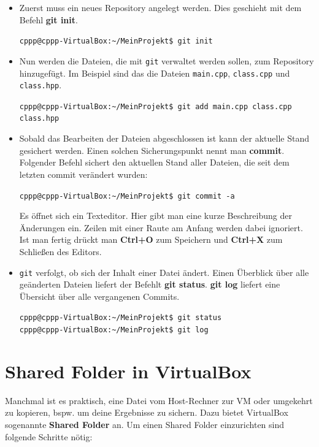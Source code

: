 \begin{itemize}
\item Zuerst muss ein neues Repository angelegt werden. Dies geschieht mit dem Befehl \textbf{git init}.

\texttt{cppp@cppp-VirtualBox:\textasciitilde/MeinProjekt\$ git init}

\item Nun werden die Dateien, die mit \texttt{git} verwaltet werden sollen, zum Repository hinzugefügt. Im Beispiel sind das die Dateien \texttt{main.cpp}, \texttt{class.cpp} und \texttt{class.hpp}.

\texttt{cppp@cppp-VirtualBox:\textasciitilde/MeinProjekt\$ git add main.cpp class.cpp class.hpp}

\item Sobald das Bearbeiten der Dateien abgeschlossen ist kann der aktuelle Stand gesichert werden. Einen solchen Sicherungspunkt nennt man \textbf{commit}. Folgender Befehl sichert den aktuellen Stand aller Dateien, die seit dem letzten commit verändert wurden:

\texttt{cppp@cppp-VirtualBox:\textasciitilde/MeinProjekt\$ git commit -a}

Es öffnet sich ein Texteditor. Hier gibt man eine kurze Beschreibung der Änderungen ein. Zeilen mit einer Raute am Anfang werden dabei ignoriert. Ist man fertig drückt man \textbf{Ctrl+O} zum Speichern und \textbf{Ctrl+X} zum Schließen des Editors.

\item \texttt{git} verfolgt, ob sich der Inhalt einer Datei ändert. Einen Überblick über alle geänderten Dateien liefert der Befehlt \textbf{git status}. \textbf{git log} liefert eine Übersicht über alle vergangenen Commits.

\texttt{cppp@cppp-VirtualBox:\textasciitilde/MeinProjekt\$ git status}\\
\texttt{cppp@cppp-VirtualBox:\textasciitilde/MeinProjekt\$ git log}

\end{itemize}

\section{Shared Folder in VirtualBox}

Manchmal ist es praktisch, eine Datei vom Host-Rechner zur VM oder umgekehrt zu kopieren, bspw. um deine Ergebnisse zu sichern.
Dazu bietet VirtualBox sogenannte \textbf{Shared Folder} an.
Um einen Shared Folder einzurichten sind folgende Schritte nötig:

